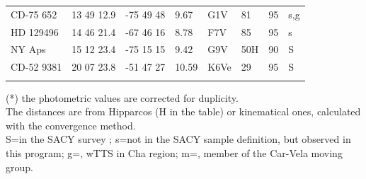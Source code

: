 \documentclass[11pt,twoside]{book}
\begin{document}
\begin{table}[!ht]
{\begin{tabular}{lcclllrl}
CD-75 652   &13 49 12.9&    -75 49 48&\hspace{2mm}9.67 &       G1V&\hspace{2mm}81&95&s,g\\
HD 129496   &14 46 21.4&    -67 46 16&\hspace{2mm}8.78  &     F7V&\hspace{2mm}85&95&s\\
NY Aps      &15 12 23.4&    -75 15 15 &\hspace{2mm}9.42&       G9V&\hspace{2mm}50H&90&S\\
CD-52 9381  &20 07 23.8&    -51 47 27&      10.59    &   K6Ve&\hspace{2mm}29&95&S\\

\noalign{\smallskip}
\hline
\noalign{\smallskip}
\end{tabular}
\smallskip
}

{(*) the photometric values are corrected for duplicity.\\
The distances are from Hipparcos (H in the table) or kinematical ones,
calculated with the convergence method.\\
S=in the SACY survey \citet{torres06}; s=not in the SACY sample definition, but
observed in this program;
g=\citet{guenther07}, wTTS in Cha region;
m=\citet{makarov00}, member of the Car-Vela moving group.
 }

\end{table}
\end{document}
